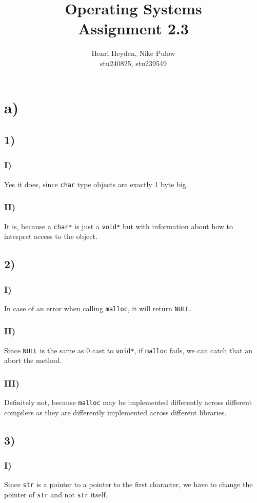 \documentclass[12pt, a4paper]{article}
\title{Operating Systems\\Assignment 2.3}
\author{Henri Heyden, Nike Pulow \\ \small stu240825, stu239549}
\date{}
\begin{document}
\maketitle

\singlespacing

\section*{a)}
\subsection*{1)}
\subsubsection*{I)}
Yes it does, since \verb|char| type objects are exactly 1 byte big.
\subsubsection*{II)}
It is, because a \verb|char*| is just a \verb|void*| but with information about how to interpret access to the object.
\subsection*{2)}
\subsubsection*{I)}
In case of an error when calling \verb|malloc|, it will return \verb|NULL|.
\subsubsection*{II)}
Since \verb|NULL| is the same as 0 cast to \verb|void*|, if \verb|malloc| fails, we can catch that an abort the method.
\subsubsection*{III)}
Definitely not, because \verb|malloc| may be implemented differently across different compilers as they are differently implemented across different libraries.
\subsection*{3)}
\subsubsection*{I)}
Since \verb|str| is a pointer to a pointer to the first character, we have to change the pointer of \verb|str| and not \verb|str| itself.
\end{document}
